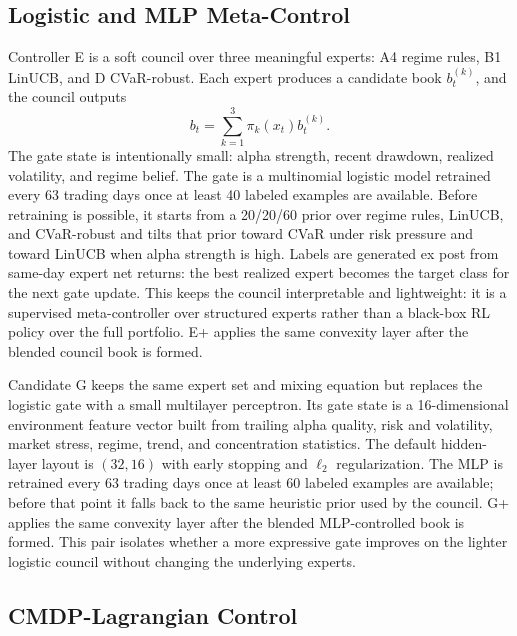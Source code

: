 \documentclass[10pt,twocolumn]{article}
\begin{document}
\subsection{Logistic and MLP Meta-Control}

Controller E is a soft council over three meaningful experts: A4 regime rules,
B1 LinUCB, and D CVaR-robust. Each expert produces a candidate book
$b_t^{(k)}$, and the council outputs
\[
b_t = \sum_{k=1}^3 \pi_k(x_t)b_t^{(k)}.
\]
The gate state is intentionally small: alpha strength, recent drawdown,
realized volatility, and regime belief.
The gate is a multinomial logistic model retrained every 63 trading days once
at least 40 labeled examples are available. Before retraining is possible, it
starts from a 20/20/60 prior over regime rules, LinUCB, and CVaR-robust and
tilts that prior toward CVaR under risk pressure and toward LinUCB when alpha
strength is high. Labels are generated ex post from same-day expert net
returns: the best realized expert becomes the target class for the next gate
update. This keeps the council interpretable and lightweight: it is a
supervised meta-controller over structured experts rather than a black-box RL
policy over the full portfolio. E+ applies the same convexity layer after the
blended council book is formed.

Candidate G keeps the same expert set and mixing equation but replaces the
logistic gate with a small multilayer perceptron. Its gate state is a
16-dimensional environment feature vector built from trailing alpha quality,
risk and volatility, market stress, regime, trend, and concentration
statistics. The default hidden-layer layout is $(32,16)$ with early stopping
and $\ell_2$ regularization. The MLP is retrained every 63 trading days once
at least 60 labeled examples are available; before that point it falls back to
the same heuristic prior used by the council. G+ applies the same convexity
layer after the blended MLP-controlled book is formed. This pair isolates
whether a more expressive gate improves on the lighter logistic council
without changing the underlying experts.

\subsection{CMDP-Lagrangian Control}
\end{document}
